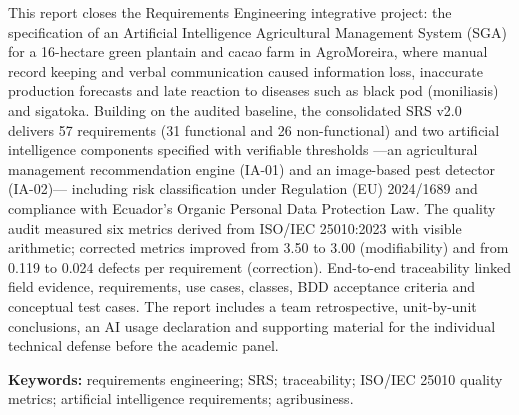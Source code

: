 This report closes the Requirements Engineering integrative project: the specification of an Artificial Intelligence Agricultural Management System (SGA) for a 16-hectare green plantain and cacao farm in AgroMoreira, where manual record keeping and verbal communication caused information loss, inaccurate production forecasts and late reaction to diseases such as black pod (moniliasis) and sigatoka. Building on the audited baseline, the consolidated SRS v2.0 delivers 57 requirements (31 functional and 26 non-functional) and two artificial intelligence components specified with verifiable thresholds ---an agricultural management recommendation engine (IA-01) and an image-based pest detector (IA-02)--- including risk classification under Regulation (EU) 2024/1689 and compliance with Ecuador's Organic Personal Data Protection Law. The quality audit measured six metrics derived from ISO/IEC 25010:2023 with visible arithmetic; corrected metrics improved from 3.50 to 3.00 (modifiability) and from 0.119 to 0.024 defects per requirement (correction). End-to-end traceability linked field evidence, requirements, use cases, classes, BDD acceptance criteria and conceptual test cases. The report includes a team retrospective, unit-by-unit conclusions, an AI usage declaration and supporting material for the individual technical defense before the academic panel.

\vspace{0.4cm}
\noindent\textbf{Keywords:} requirements engineering; SRS; traceability; ISO/IEC 25010 quality metrics; artificial intelligence requirements; agribusiness.
